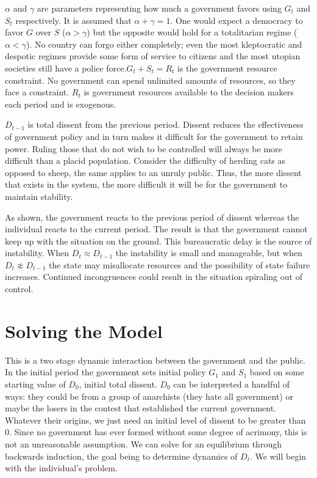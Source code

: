 \documentclass[12pt]{article}
\begin{document}
\begin{spacing}{1.5}
$\alpha$ and $\gamma $ are parameters representing how much a government favors using $G_t$ and $S_t$ respectively. It is assumed that $\alpha+\gamma=1$. One would expect a democracy to favor $G$ over $S$ ($\alpha > \gamma$) but the opposite would hold for a totalitarian regime ($\alpha < \gamma $). No country can forgo either completely; even the most kleptocratic and despotic regimes provide some form of service to citizens and the most utopian societies still have a police force.$G_t+S_t=R_t$ is the government resource constraint. No government can spend unlimited amounts of resources, so they face a constraint. $R_t$ is government resources available to the decision makers each period and is exogenous. 

$D_{t-1}$ is total dissent from the previous period. Dissent reduces the effectiveness of government policy and in turn makes it difficult for the government to retain power. Ruling those that do not wish to be controlled will always be more difficult than a placid population. Consider the difficulty of herding cats as opposed to sheep, the same applies to an unruly public. Thus, the more dissent that exists in the system, the more difficult it will be for the government to maintain stability.  


As shown, the government reacts to the previous period of dissent whereas the individual reacts to the current period. The result is that the government cannot keep up with the situation on the ground. This bureaucratic delay is the source of instability. When $D_t \approx D_{t-1}$ the instability is small and manageable, but when $D_t \not\approx D_{t-1}$ the state may misallocate resources and the possibility of state failure increases. Continued incongruences could result in the situation spiraling out of control. 

\section{Solving the Model}


This is a two stage dynamic interaction between the government and the public. In the initial period the government sets initial policy $G_1$ and $S_1$ based on some starting value of $D_0$, initial total dissent. $D_0$ can be interpreted a handful of ways: they could be from a group of anarchists (they hate all government) or maybe the losers in the contest that established the current government. Whatever their origins, we just need an initial level of dissent to be greater than 0. Since no government has ever formed without some degree of acrimony, this is not an unreasonable assumption. We can solve for an equilibrium through backwards induction, the goal being to determine dynamics of $D_t$. We will begin with the individual's problem. 


\end{spacing}
\end{document}
